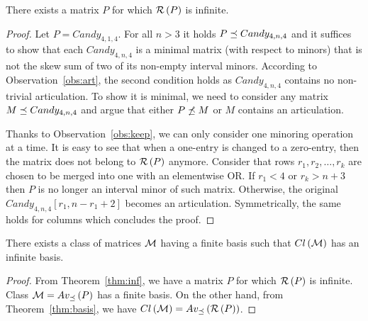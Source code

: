 \begin{thm}
\label{thm:inf}
There exists a matrix $P$ for which $\mathcal{R}\left(P\right)$ is infinite.
\end{thm}
\begin{proof}
Let $P=Candy_{4,1,4}$. For all $n>3$ it holds $P\preceq Candy_{4,n,4}$ and it suffices to show that each $Candy_{4,n,4}$ is a minimal matrix (with respect to minors) that is not the skew sum of two of its non-empty interval minors. According to Observation~\ref{obs:art}, the second condition holds as $Candy_{4,n,4}$ contains no non-trivial articulation. To show it is minimal, we need to consider any matrix $M\preceq Candy_{4,n,4}$ and argue that either $P\not\preceq M$ or $M$ contains an articulation.

Thanks to Observation~\ref{obs:keep}, we can only consider one minoring operation at a time. It is easy to see that when a one-entry is changed to a zero-entry, then the matrix does not belong to $\mathcal{R}\left(P\right)$ anymore. Consider that rows $r_1,r_2,\dots,r_k$ are chosen to be merged into one with an elementwise OR. If $r_1<4$ or $r_k>n+3$ then $P$ is no longer an interval minor of such matrix. Otherwise, the original $Candy_{4,n,4}[r_1,n-r_1+2]$ becomes an articulation. Symmetrically, the same holds for columns which concludes the proof.
\end{proof}

\begin{cor}
There exists a class of matrices $\mathcal{M}$ having a finite basis such that $Cl\left(\mathcal{M}\right)$ has an infinite basis.
\end{cor}
\begin{proof}
From Theorem~\ref{thm:inf}, we have a matrix $P$ for which $\mathcal{R}\left(P\right)$ is infinite. Class $\mathcal{M}=Av_{\preceq}\left(P\right)$ has a finite basis. On the other hand, from Theorem~\ref{thm:basis}, we have $Cl\left(\mathcal{M}\right)=Av_{\preceq}\left(\mathcal{R}\left(P\right)\right)$.
\end{proof}